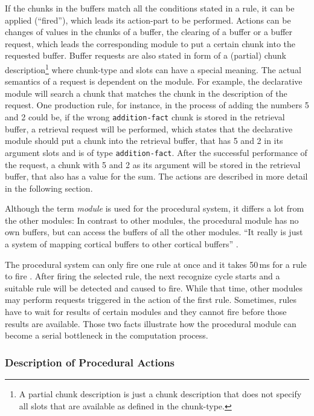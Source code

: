 If the chunks in the buffers match all the conditions stated in a rule, it can be applied (``fired''), which leads its action-part to be performed. Actions can be changes of values in the chunks of a buffer, the clearing of a buffer or a buffer request, which leads the corresponding module to put a certain chunk into the requested buffer. Buffer requests are also stated in form of a (partial) chunk description\footnote{A partial chunk description is just a chunk description that does not specify all slots that are available as defined in the chunk-type.} where chunk-type and slots can have a special meaning. The actual semantics of a request is dependent on the module. For example, the declarative module will search a chunk that matches the chunk in the description of the request. One production rule, for instance, in the process of adding the numbers 5 and 2 could be, if the wrong \verb|addition-fact| chunk is stored in the retrieval buffer, a retrieval request will be performed, which states that the declarative module should put a chunk into the retrieval buffer, that has 5 and 2 in its argument slots and is of type \verb|addition-fact|. After the successful performance of the request, a chunk with 5 and 2 as its argument will be stored in the retrieval buffer, that also has a value for the sum. The actions are described in more detail in the following section.

Although the term \emph{module} is used for the procedural system, it differs a lot from the other modules: In contrast to other modules, the procedural module has no own buffers, but can access the buffers of all the other modules. ``It really is just a system of mapping cortical buffers to other cortical buffers'' \cite[p. 54]{anderson_how_2007}.

The procedural system can only fire one rule at once and it takes 50\,ms for a rule to fire \cite[p. 54]{anderson_how_2007}. After firing the selected rule, the next recognize cycle starts and a suitable rule will be detected and caused to fire. While that time, other modules may perform requests triggered in the action of the first rule. Sometimes, rules have to wait for results of certain modules and they cannot fire before those results are available. Those two facts illustrate how the procedural module can become a serial bottleneck in the computation process.

\subsubsection{Description of Procedural Actions}
\label{description_of_proc_actions}

